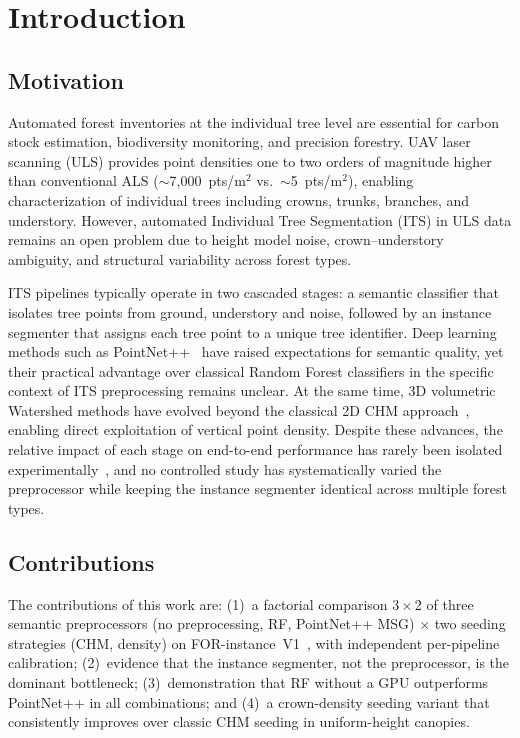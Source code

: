 \documentclass[runningheads]{llncs}
\begin{document}
\section{Introduction}\label{sec:intro}

\subsection{Motivation}

Automated forest inventories at the individual tree level are essential for carbon stock estimation, biodiversity monitoring, and precision forestry. UAV laser scanning (ULS) provides point densities one to two orders of magnitude higher than conventional ALS ($\sim$7{,}000~pts/m$^2$ vs.\ $\sim$5~pts/m$^2$), enabling characterization of individual trees including crowns, trunks, branches, and understory. However, automated Individual Tree Segmentation (ITS) in ULS data remains an open problem due to height model noise, crown--understory ambiguity, and structural variability across forest types.

ITS pipelines typically operate in two cascaded stages: a semantic classifier that isolates tree points from ground, understory and noise, followed by an instance segmenter that assigns each tree point to a unique tree identifier. Deep learning methods such as PointNet++~\cite{qi2017} have raised expectations for semantic quality, yet their practical advantage over classical Random Forest classifiers in the specific context of ITS preprocessing remains unclear. At the same time, 3D volumetric Watershed methods have evolved beyond the classical 2D CHM approach~\cite{dalponte2016}, enabling direct exploitation of vertical point density. Despite these advances, the relative impact of each stage on end-to-end performance has rarely been isolated experimentally~\cite{qi2017,breiman2001,puliti2023}, and no controlled study has systematically varied the preprocessor while keeping the instance segmenter identical across multiple forest types.

\subsection{Contributions}

The contributions of this work are: (1)~a factorial comparison $3 \times 2$ of three semantic preprocessors (no preprocessing, RF, PointNet++ MSG) $\times$ two seeding strategies (CHM, density) on FOR-instance~V1~\cite{puliti2023}, with independent per-pipeline calibration; (2)~evidence that the instance segmenter, not the preprocessor, is the dominant bottleneck; (3)~demonstration that RF without a GPU outperforms PointNet++ in all combinations; and (4)~a crown-density seeding variant that consistently improves over classic CHM seeding in uniform-height canopies.
\end{document}
